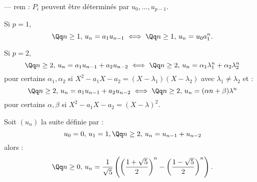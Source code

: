 \documentclass[class=report,crop=false]{standalone}
\begin{document}
--- rem : $P_i$ peuvent être déterminés par $u_0,...,u_{p-1}$.

\begin{exemple}
Si $p =1$,
\[\Qq n \ge 1,\, u_n = a_1u_{n-1} \iff \Qq n \ge 1, \, u_n = u_0 a_1^n .\]

Si $p =2 $, \[\Qq n \ge 2 ,\, u_n = a_1 u_{n-1} + a_2u_{n-2} \iff \Qq n \ge 2,\, u_n = \alpha_1 \lambda_1^n + \alpha_2 \lambda_2^n\]
pour certains $\alpha_1,\alpha_2$ si $X^2 -a_1X-a_2 = (X-\lambda_1)(X-\lambda_2)$ avec $\lambda_1 \neq \lambda_2$ et :
\[\Qq n \ge 2 ,\, u_n = a_1 u_{n-1} + a_2u_{n-2} \iff \Qq n \ge 2,\, u_n = (\alpha n+ \beta) \lambda^n \]
pour certains $\alpha,\beta$ si $X^2 -a_1X-a_2 = (X-\lambda)^2$.
\end{exemple}

\begin{exercicecours}
Soit $(u_n)$ la suite définie par :
\[u_0 = 0, \, u_1=1, \Qq n \ge 2 ,\, u_n=u_{n-1}+u_{n-2}\]
alors :
\[\Qq n \ge 0, \, u_n = \frac{1}{\sqrt{5}} \left({\left(\frac{1+\sqrt{5}}{2}\right)^n -\left(\frac{1-\sqrt{5}}{2}\right)^n }\right). \]
\end{exercicecours}
\end{document}
